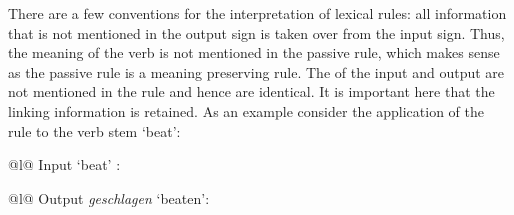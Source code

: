 \noindent
There are a few conventions for the interpretation of lexical rules: all information that is not mentioned
in the output sign is taken over from the input sign. Thus, the meaning of the verb is not mentioned
in the passive rule, which makes sense as the passive rule is a meaning preserving rule. The \contvs
of the input and output are not mentioned in the rule and hence are identical. It is important here that the linking
information is retained. As an example consider the application of the rule to the verb stem
 `beat': 
\eal
\label{lr-passiv-beispiel}
\ex 
\begin{tabular}[t]{@{}l@{}}
Input  `beat' :\\
\end{tabular}
\ex 
\begin{tabular}[t]{@{}l@{}}
Output \emph{geschlagen} `beaten':\\
\end{tabular}
